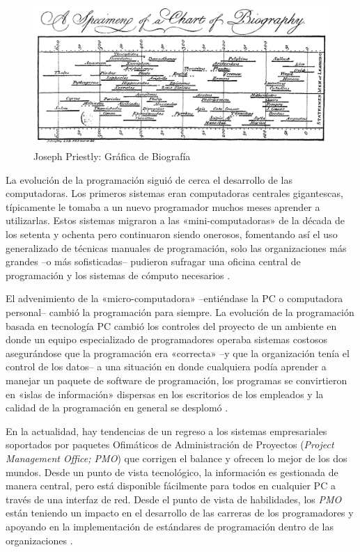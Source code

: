 \documentclass[draft,12pt,headsepline,footsepline,paper=letter]{scrreprt}
\begin{document}
\begin{figure}[hbtp]
\centering
\includegraphics[width=\textwidth]{media/PriestleyChart.png}
\caption[Gr\'afica de Biograf\'ia]{Joseph Priestly: Gr\'afica de Biograf\'ia}
\label{fig:chart_biography}
\end{figure}

La evolución de la programación siguió de cerca el desarrollo de las computadoras. Los primeros sistemas eran computadoras centrales gigantescas, típicamente le tomaba a un nuevo programador muchos meses aprender a utilizarlas. Estos sistemas migraron a las «mini-computadoras» de la década de los setenta y ochenta pero continuaron siendo onerosos, fomentando así el uso generalizado de técnicas manuales de programación, solo las organizaciones más grandes –o más sofisticadas– pudieron sufragar una oficina central de programación y los sistemas de cómputo necesarios \citep[p.~2]{Weaver2006}.

El advenimiento de la «micro-computadora» –entiéndase la PC o computadora personal– cambió la programación para siempre. La evolución de la programación basada en tecnología PC cambió los controles del proyecto de un ambiente en donde un equipo especializado de programadores operaba sistemas costosos asegurándose que la programación era «correcta» –y que la organización tenía el control de los datos– a una situación en donde cualquiera podía aprender a manejar un paquete de software de programación, los programas se convirtieron en «islas de información» dispersas en los escritorios de los empleados y la calidad de la programación en general se desplomó \citep[p.~2]{Weaver2006}.

En la actualidad, hay tendencias de un regreso a los sistemas empresariales soportados por paquetes Ofimáticos de Administración de Proyectos (\textit{Project Management Office; PMO}) que corrigen el balance y ofrecen lo mejor de los dos mundos. Desde un punto de vista tecnológico, la información es gestionada de manera central, pero está disponible fácilmente para todos en cualquier PC a través de una interfaz de red. Desde el punto de vista de habilidades, los \textit{PMO} están teniendo un impacto en el desarrollo de las carreras de los programadores y apoyando en la implementación de estándares de programación dentro de las organizaciones \citep[p.~2]{Weaver2006}.
\end{document}
